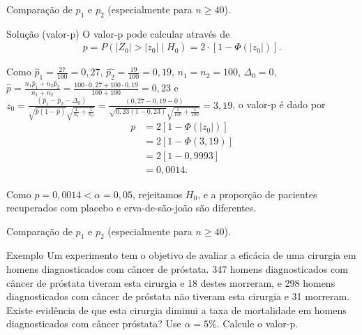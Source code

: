 \documentclass[9pt]{beamer}
\begin{document}
\begin{frame}{Comparação de $p_1$ e $p_2$ (especialmente para $n 
	\geq 40$).}

\begin{block}{Solução (valor-p)}
	O valor-p pode calcular através de
	\begin{align*}
		p = P\left( \lvert Z_0 \rvert > \lvert z_0 \rvert \mid H_0 \right) = 2 \cdot \left[ 1 - \Phi(\lvert z_0 \rvert) \right].
	\end{align*}
	
	Como $\hat{p}_1 = \frac{27}{100} = 0,27$, $\hat{p_2} = \frac{19}{100}=0,19$, $n_1=n_2=100$, $\Delta_0=0$, $\hat{p} = \frac{n_1 \hat{p}_1 + n_2 \hat{p}_2}{n_1 + n_2} = \frac{100\cdot 0,27 + 100\cdot 0,19}{100 + 100} = 0,23$ e $z_0 = \frac{(\hat{p}_1 - \hat{p}_2 - \Delta_0)}{\sqrt{\hat{p}(1 - \hat{p})}\sqrt{\frac{1}{n_1} + \frac{1}{n_2}}} = \frac{(0,27 - 0,19 - 0)}{\sqrt{0,23(1 - 0,23)}\sqrt{\frac{1}{100} + \frac{1}{100}}} = 3,19$, o valor-p é dado por
	\begin{align*}
		p &= 2 \left[ 1 - \Phi \left( \lvert z_0 \rvert \right)\right]\\
		&= 2 \left[ 1 - \Phi \left( 3,19 \right)  \right]\\
		&= 2 \left[1 - 0,9993 \right]\\
		&= 0,0014.
	\end{align*}
	
	Como $p=0,0014 < \alpha = 0,05$, rejeitamos $H_0$, e a proporção de pacientes recuperados com placebo e erva-de-são-joão são diferentes.
\end{block}

\end{frame}

\begin{frame}{Comparação de $p_1$ e $p_2$ (especialmente para $n 
	\geq 40$).}

\large
\begin{block}{Exemplo}
	Um experimento tem o objetivo de avaliar a eficácia de uma cirurgia em homens diagnosticados com câncer de próstata. 347 homens diagnosticados com câncer de próstata tiveram esta cirurgia e 18 destes morreram, e 298 homens diagnosticados com câncer de próstata não tiveram esta cirurgia e 31 morreram. Existe evidência de que esta cirurgia diminui a taxa de mortalidade em homens diagnosticados com câncer próstata? Use $\alpha=5\%$. Calcule o valor-p.
\end{block}
\normalsize

\end{frame}
\end{document}
